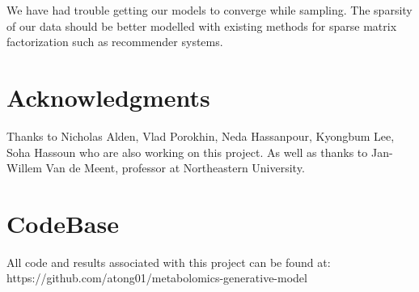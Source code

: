 \documentclass[11pt]{article}
\begin{document}
We have had trouble getting our models to converge while sampling. The sparsity of our data should be better modelled with existing methods for sparse matrix factorization such as recommender systems. 

\section{Acknowledgments}

Thanks to Nicholas Alden, Vlad Porokhin, Neda Hassanpour, Kyongbum Lee, Soha Hassoun who are also working on this project. As well as thanks to Jan-Willem Van de Meent, professor at Northeastern University.

\section{CodeBase}

All code and results associated with this project can be found at: \\https://github.com/atong01/metabolomics-generative-model


\end{document}
